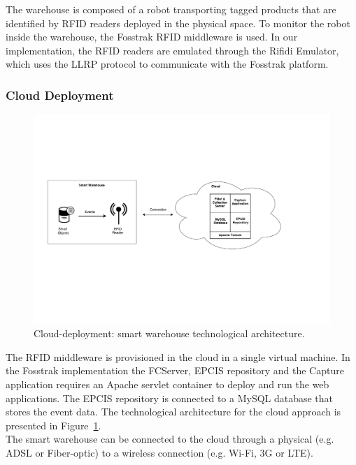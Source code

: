 The warehouse is composed of a robot transporting tagged products that are identified by \gls{RFID} readers
deployed in the physical space. To monitor the robot inside the warehouse, the Fosstrak \gls{RFID} middleware
is used. In our implementation, the \gls{RFID} readers are emulated through the Rifidi Emulator, which uses
the \gls{LLRP} protocol to communicate with the Fosstrak platform.

\subsubsection{Cloud Deployment}
\label{subs:imp_smart_warehouse_cloud}

\begin{figure}
\centering
\includegraphics[width=\textwidth]{./images/implementation_cloud_architecture}
\caption[Cloud-deployment: technological architecture.]{Cloud-deployment: smart warehouse technological architecture.}
\label{fig:implementation_cloud_architecture}
\end{figure}

The \gls{RFID} middleware is provisioned in the cloud in a single virtual machine. In the
Fosstrak implementation the \gls{FCServer}, \gls{EPCIS} repository and the Capture application
requires an Apache servlet container to deploy and run the web applications. The \gls{EPCIS}
repository is connected to a MySQL database that stores the event data. The technological architecture
for the cloud approach is presented in Figure~\ref{fig:implementation_cloud_architecture}.\\

The smart warehouse can be connected to the cloud through a physical (e.g. \gls{ADSL} or Fiber-optic)
to a wireless connection (e.g. Wi-Fi, 3G or \gls{LTE}).


